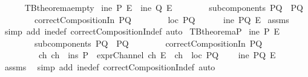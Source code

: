 \begin{isabellebody}
\endisatagproof
{\isafoldproof}%
%
\isadelimproof
\ \ \ \ \isanewline
%
\endisadelimproof
\isanewline
{}\isamarkupfalse%
\ TBtheorem{}a{\isacharunderscore}empty{\isacharcolon}\isanewline
{}\ {\isachardoublequoteopen}{\isacharparenleft}ine\ P\ E{\isacharparenright}\ {\isasymor}\ {\isacharparenleft}ine\ Q\ E{\isacharparenright}{\isachardoublequoteclose}\isanewline
\ \ \ \ \ \ \ \ {\isachardoublequoteopen}subcomponents\ PQ\ {\isacharequal}\ {\isacharbraceleft}P{\isacharcomma}Q{\isacharbraceright}{\isachardoublequoteclose}\isanewline
\ \ \ \ \ \ \ \ {\isachardoublequoteopen}correctCompositionIn\ PQ{\isachardoublequoteclose}\isanewline
\ \ \ \ \ \ \ \ {\isachardoublequoteopen}loc\ PQ\ {\isacharequal}\ {\isacharbraceleft}{\isacharbraceright}{\isachardoublequoteclose}\isanewline
{}\ \ \ \ {\isachardoublequoteopen}ine\ PQ\ E{\isachardoublequoteclose}\isanewline
%
\isadelimproof
%
\endisadelimproof
%
\isatagproof
{}\isamarkupfalse%
\ assms\ \isamarkupfalse%
\ {\isacharparenleft}simp\ add{\isacharcolon}\ ine{\isacharunderscore}def\ correctCompositionIn{\isacharunderscore}def{\isacharcomma}\ auto{\isacharparenright}%
\endisatagproof
{\isafoldproof}%
%
\isadelimproof
\isanewline
%
\endisadelimproof
\isanewline
{}\isamarkupfalse%
\ TBtheorem{}a{\isacharunderscore}P{\isacharcolon}\isanewline
{}\ {\isachardoublequoteopen}ine\ P\ E{\isachardoublequoteclose}\isanewline
\ \ \ \ \ \ \ \ {\isachardoublequoteopen}subcomponents\ PQ\ {\isacharequal}\ {\isacharbraceleft}P{\isacharcomma}Q{\isacharbraceright}{\isachardoublequoteclose}\isanewline
\ \ \ \ \ \ \ \ {\isachardoublequoteopen}correctCompositionIn\ PQ{\isachardoublequoteclose}\isanewline
\ \ \ \ \ \ \ \ {\isachardoublequoteopen}{\isasymexists}\ ch{\isachardot}\ {\isacharparenleft}ch\ {\isasymin}\ {\isacharparenleft}ins\ P{\isacharparenright}\ {\isasymand}\ exprChannel\ ch\ E\ {\isasymand}\ ch\ {\isasymnotin}\ {\isacharparenleft}loc\ PQ{\isacharparenright}{\isacharparenright}{\isachardoublequoteclose}\isanewline
{}\ \ \ \ {\isachardoublequoteopen}ine\ PQ\ E{\isachardoublequoteclose}\isanewline
%
\isadelimproof
%
\endisadelimproof
%
\isatagproof
{}\isamarkupfalse%
\ assms\ \isamarkupfalse%
\ {\isacharparenleft}simp\ add{\isacharcolon}\ ine{\isacharunderscore}def\ correctCompositionIn{\isacharunderscore}def{\isacharcomma}\ auto{\isacharparenright}%

\end{isabellebody}
